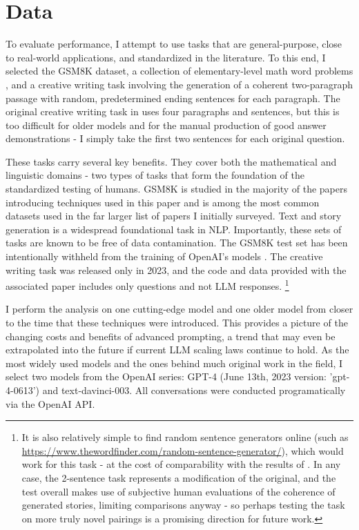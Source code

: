 \documentclass[11pt]{article}
\begin{document}
\section*{Data}

To evaluate performance, I attempt to use tasks that are general-purpose, close to real-world applications, and standardized in the literature. To this end, I selected the GSM8K dataset, a collection of elementary-level math word problems \cite{cobbe_training_2021}, and a creative writing task involving the generation of a coherent two-paragraph passage with random, predetermined ending sentences for each paragraph. The original creative writing task in \citealp{yao_tree_2023} uses four paragraphs and sentences, but this is too difficult for older models and for the manual production of good answer demonstrations - I simply take the first two sentences for each original question. 

These tasks carry several key benefits. They cover both the mathematical and linguistic domains - two types of tasks that form the foundation of the standardized testing of humans. GSM8K is studied in the majority of the papers introducing techniques used in this paper and is among the most common datasets used in the far larger list of papers I initially surveyed. Text and story generation is a widespread foundational task in NLP. Importantly, these sets of tasks are known to be free of data contamination. The GSM8K test set has been intentionally withheld from the training of OpenAI's models \cite{openai_gpt-4_2023}. The creative writing task was released only in 2023, and the code and data provided with the associated paper includes only questions and not LLM responses. \footnote{It is also relatively simple to find random sentence generators online (such as \url{https://www.thewordfinder.com/random-sentence-generator/}), which would work for this task - at the cost of comparability with the results of \cite{yao_tree_2023}. In any case, the 2-sentence task represents a modification of the original, and the test overall makes use of subjective human evaluations of the coherence of generated stories, limiting comparisons anyway - so perhaps testing the task on more truly novel pairings is a promising direction for future work.}

I perform the analysis on one cutting-edge model and one older model from closer to the time that these techniques were introduced. This provides a picture of the changing costs and benefits of advanced prompting, a trend that may even be extrapolated into the future if current LLM scaling laws continue to hold. As the most widely used models and the ones behind much original work in the field, I select two models from the OpenAI series: GPT-4 (June 13th, 2023 version: 'gpt-4-0613') and text-davinci-003. All conversations were conducted programatically via the OpenAI API.
\end{document}
